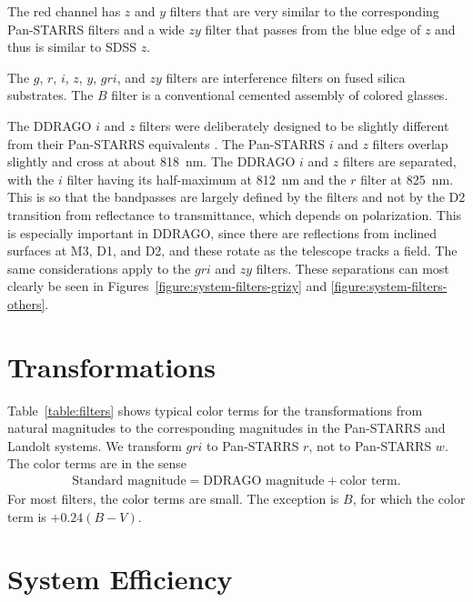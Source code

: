 The red channel has $z$ and $y$ filters that are very similar to the corresponding Pan-STARRS filters and a wide $zy$ filter that passes from the blue edge of $z$ and thus is similar to SDSS $z$.

The $g$, $r$, $i$, $z$, $y$, $gri$, and $zy$ filters are interference filters on fused silica substrates. The $B$ filter is a conventional cemented assembly of colored glasses.

The DDRAGO $i$ and $z$ filters were deliberately designed to be slightly different from their Pan-STARRS equivalents \citep{Tonry-2012}. The Pan-STARRS $i$ and $z$ filters overlap slightly and cross at about 818~nm. The DDRAGO $i$ and $z$ filters are separated, with the $i$ filter having its half-maximum at 812~nm and the $r$ filter at 825~nm. This is so that the bandpasses are largely defined by the filters and not by the D2 transition from reflectance to transmittance, which depends on polarization. This is especially important in DDRAGO, since there are reflections from inclined surfaces at M3, D1, and D2, and these rotate as the telescope tracks a field. The same considerations apply to the $gri$ and $zy$ filters. These separations can most clearly be seen in Figures~\ref{figure:system-filters-grizy} and \ref{figure:system-filters-others}.


\section{Transformations}

Table~\ref{table:filters} shows typical color terms for the transformations from natural magnitudes to the corresponding magnitudes in the Pan-STARRS and Landolt systems. We transform $gri$ to Pan-STARRS $r$, not to Pan-STARRS $w$. The color terms are in the sense
\begin{align}
\mbox{Standard magnitude} = \mbox{DDRAGO magnitude} + \mbox{color term}.
\end{align}
For most filters, the color terms are small. The exception is $B$, for which the color term is $+0.24(B-V)$.

\section{System Efficiency}

